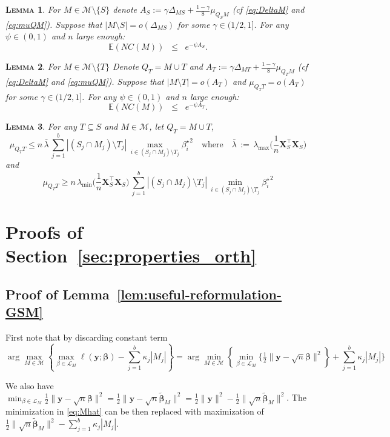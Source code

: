 \documentclass[aos]{imsart}
\theoremstyle{plain}
\newtheorem{lem}{\textsc{Lemma}}[section]
\newcommand{\E}{\mathbb{E}}
\newcommand{\bs}{\boldsymbol}
\begin{document}
\begin{supplement}
\begin{lem}\label{lem:boundexpnc} For $M\in \mathcal{M}\setminus \{S\}$ denote $A_S:=\gamma\Delta_{MS}+\tfrac{1-\gamma}{8}\mu_{Q_SM}$ (cf \eqref{eq:DeltaM} and \eqref{eq:muQM}). Suppose that $|M\setminus S|=o(\Delta_{MS})$ for some $\gamma \in (1/2,1]$. For any $\psi\in(0,1)$ and $n$ large enough:
$$\E\left(NC(M)\right)  \;\;\leq\;\; e^{-\psi A_S}.$$
\end{lem}

\begin{lem}\label{lem:boundexpnc2} For $M\in \mathcal{M}\setminus \{T\}$ 
Denote $Q_T= M\cup T$ and $A_T:=\gamma\Delta_{MT}+\tfrac{1-\gamma}{8}\mu_{Q_TM}$ (cf \eqref{eq:DeltaM} and \eqref{eq:muQM}). Suppose that $|M\setminus T|=o(A_T)$ and $\mu_{Q_T T}=o(A_T)$  for some $\gamma \in (1/2,1]$. For any $\psi\in(0,1)$ and $n$ large enough:
$$\E\left(NC(M)\right)  \;\;\leq\;\; e^{-\psi A_T}.$$
\end{lem}

\begin{lem}\label{lem:upperboundnoncentralgen}
    For any $T\subseteq S$ and $M\in \mathcal{M}$, let $Q_T=M\cup T$, $$\mu_{Q_TT} \leq n\,\bar{\lambda}\,\sum_{j=1}^b|(S_j\cap M_j )\setminus T_j|\,\max_{i\in (S_j\cap M_j )\setminus T_j}{\beta_{i}^{\star}}^2 \quad \text{where}\quad \bar{\lambda}\,:=\,\lambda_{\max}\Big(\frac1n \bs X_{S}^\top\bs X_{S}\Big)$$
    and
    $$\mu_{Q_TT} \geq n\,\lambda_{\min}\Big(\frac1n \bs X_{S}^\top\bs X_{S}\Big)\,\sum_{j=1}^b|(S_j\cap M_j )\setminus T_j|\,\min_{i\in (S_j\cap M_j )\setminus T_j}{\beta_{i}^{\star}}^2$$
\end{lem}

\section{Proofs of Section~\ref{sec:properties_orth}}


\subsection{Proof of Lemma~\ref{lem:useful-reformulation-GSM}}
First note that by discarding constant term 
 $$\arg\max_{M\in \mathcal{M}} \left\{\max_{\beta\in \mathcal{L}_M}\ell(\bs y; \bs \beta)-\sum_{j=1}^b\kappa_j |M_j| \right\}=\arg\min_{M\in \mathcal{M}} \left\{\min_{\beta\in \mathcal{L}_M}\bigg\{ \tfrac{1}{2}\|\bs y-\sqrt{n}\bs\beta\|^2\right\}+\sum_{j=1}^b\kappa_j |M_j| \bigg\}$$
 
 We also have $\min_{\beta\in \mathcal{L}_M} \tfrac{1}{2}\|\bs y-\sqrt{n}\bs\beta\|^2=\tfrac{1}{2}\|\bs y-\sqrt{n}\tilde{\bs \beta}_M\|^2=\tfrac{1}{2}\|\bs y\|^2-\tfrac{1}{2}\|\sqrt{n}\tilde{\bs \beta}_M\|^2$. The minimization in \eqref{eq:Mhat} can be then replaced with maximization of $\tfrac{1}{2}
 \|\sqrt{n}\tilde{\bs \beta}_M\|^2-\sum_{j=1}^b \kappa_j|M_j|$.


\end{supplement}
\end{document}
